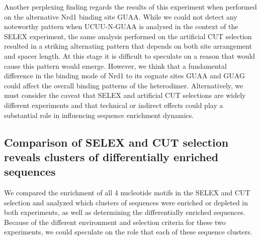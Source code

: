 Another perplexing finding regards the results of this experiment when performed on the alternative Nrd1 binding site GUAA. While we could not detect any noteworthy pattern when UCUU-N-GUAA is analysed in the context of the SELEX experiment, the same analysis performed on the artificial CUT selection resulted in a striking alternating pattern that depends on both site arrangement and spacer length. At this stage it is difficult to speculate on a reason that would cause this pattern would emerge. However, we think that a fundamental difference in the binding mode of Nrd1 to its cognate sites GUAA and GUAG could affect the overall binding patterns of the heterodimer. Alternatively, we must consider the caveat that SELEX and artificial CUT selections are widely different experiments and that technical or indirect effects could play a substantial role in influencing sequence enrichment dynamics. 

\singlespacing
\subsection{Comparison of SELEX and \invivo{} CUT selection reveals clusters of differentially enriched sequences}
\doublespacing

We compared the enrichment of all 4 nucleotide motifs in the SELEX and \invivo{} CUT selection and analyzed which clusters of sequences were enriched or depleted in both experiments, as well as determining the differentially enriched sequences. Because of the different environment and selection criteria for these two experiments, we could speculate on the role that each of these sequence clusters. 

